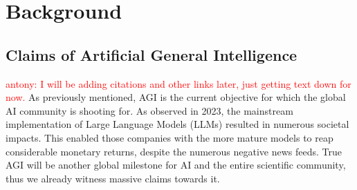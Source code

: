 \documentclass{article}
\theoremstyle{plain}
\theoremstyle{definition}
\theoremstyle{remark}
\begin{document}

\section{Background}

\subsection{Claims of Artificial General Intelligence}

\textcolor{red}{antony: I will be adding citations and other links later, just getting text down for now.}
As previously mentioned, AGI is the current objective for which the global AI community is shooting for. As observed in 2023, the mainstream implementation of Large Language Models (LLMs) resulted in numerous societal impacts. This enabled those companies with the more mature models to reap considerable monetary returns, despite the numerous negative news feeds. True AGI will be another global milestone for AI and the entire scientific community, thus we already witness massive claims towards it.
\end{document}
